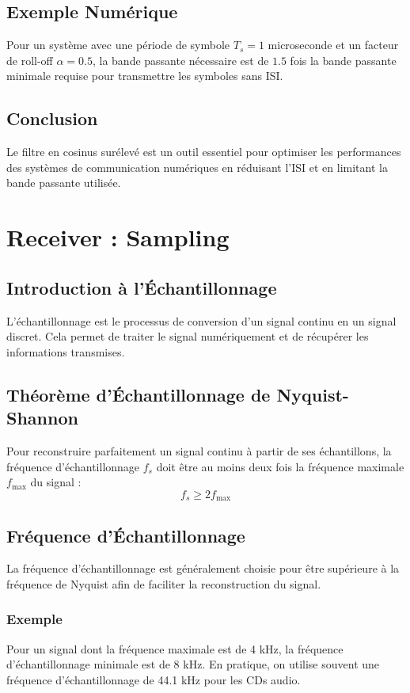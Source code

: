 \documentclass[10pt,a4paper]{article}
\begin{document}
\subsection*{Exemple Numérique}
Pour un système avec une période de symbole \( T_s = 1 \) microseconde et un facteur de roll-off \( \alpha = 0.5 \), la bande passante nécessaire est de \( 1.5 \) fois la bande passante minimale requise pour transmettre les symboles sans ISI.

\subsection*{Conclusion}
Le filtre en cosinus surélevé est un outil essentiel pour optimiser les performances des systèmes de communication numériques en réduisant l'ISI et en limitant la bande passante utilisée.

\section*{Receiver : Sampling}

\subsection*{Introduction à l'Échantillonnage}
L'échantillonnage est le processus de conversion d'un signal continu en un signal discret. Cela permet de traiter le signal numériquement et de récupérer les informations transmises.

\subsection*{Théorème d'Échantillonnage de Nyquist-Shannon}
Pour reconstruire parfaitement un signal continu à partir de ses échantillons, la fréquence d'échantillonnage \( f_s \) doit être au moins deux fois la fréquence maximale \( f_{\text{max}} \) du signal :
\[ f_s \geq 2f_{\text{max}} \]

\subsection*{Fréquence d'Échantillonnage}
La fréquence d'échantillonnage est généralement choisie pour être supérieure à la fréquence de Nyquist afin de faciliter la reconstruction du signal.

\subsubsection*{Exemple}
Pour un signal dont la fréquence maximale est de 4 kHz, la fréquence d'échantillonnage minimale est de 8 kHz. En pratique, on utilise souvent une fréquence d'échantillonnage de 44.1 kHz pour les CDs audio.
\end{document}
